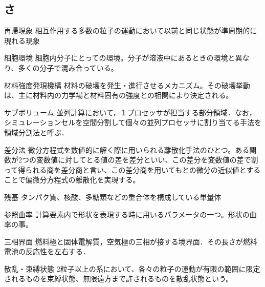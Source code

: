 \begin{用語集}
\section{さ}
\item{再帰現象}{}
{相互作用する多数の粒子の運動において以前と同じ状態が準周期的に現れる現象}
\item{細胞環境}{}
{細胞内分子にとっての環境。分子が溶液中にあるときの環境と異なり、多くの分子で混み合っている。}
\item{材料強度発現機構}{}
{材料の破壊を発生・進行させるメカニズム。その破壊挙動は、主に材料内の力学場と材料固有の強度との相関により決定される。}
\item{サブボリューム}{}
{並列計算において，１プロセッサが担当する部分領域．なお，シミュレーションセルを空間分割して個々の並列プロセッサに割り当てる手法を領域分割法と呼ぶ．}
\item{差分法}{}
{微分方程式を数値的に解く際に用いられる離散化手法のひとつ。ある関数が2つの変数値に対してとる値の差を差分といい、この差分を変数値の差で割って得られる商を差分商と言い、この差分商を用いてもとの微分の近似値とすることで偏微分方程式の離散化を実現する。}
\item{残基}{}
{タンパク質、核酸、多糖類などの重合体を構成している単量体}
\item{参照曲率}{}
{計算要素内で形状を表現する時に用いるパラメータの一つ。形状の曲率の事。}
\item{三相界面}{}
{燃料極と固体電解質，空気極の三相が接する境界面．その長さが燃料電池の反応性を左右する．}
\item{散乱・束縛状態}{}
{2粒子以上の系において、各々の粒子の運動が有限の範囲に限定されるものを束縛状態、無限遠方まで許されるものを散乱状態という。}

\end{用語集}
